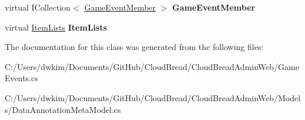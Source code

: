 \begin{DoxyCompactItemize}
\item 
virtual I\+Collection$<$ \hyperlink{a00081}{Game\+Event\+Member} $>$ {\bfseries Game\+Event\+Member}\hypertarget{a00083_ae10ac9975db38c804f7b73c553f20347}{}\label{a00083_ae10ac9975db38c804f7b73c553f20347}

\item 
virtual \hyperlink{a00127}{Item\+Lists} {\bfseries Item\+Lists}\hypertarget{a00083_af9f89517a0504a7bf3d4647dc27b13cd}{}\label{a00083_af9f89517a0504a7bf3d4647dc27b13cd}

\end{DoxyCompactItemize}


The documentation for this class was generated from the following files\+:\begin{DoxyCompactItemize}
\item 
C\+:/\+Users/dwkim/\+Documents/\+Git\+Hub/\+Cloud\+Bread/\+Cloud\+Bread\+Admin\+Web/Game\+Events.\+cs\item 
C\+:/\+Users/dwkim/\+Documents/\+Git\+Hub/\+Cloud\+Bread/\+Cloud\+Bread\+Admin\+Web/\+Models/Data\+Annotation\+Meta\+Model.\+cs\end{DoxyCompactItemize}
